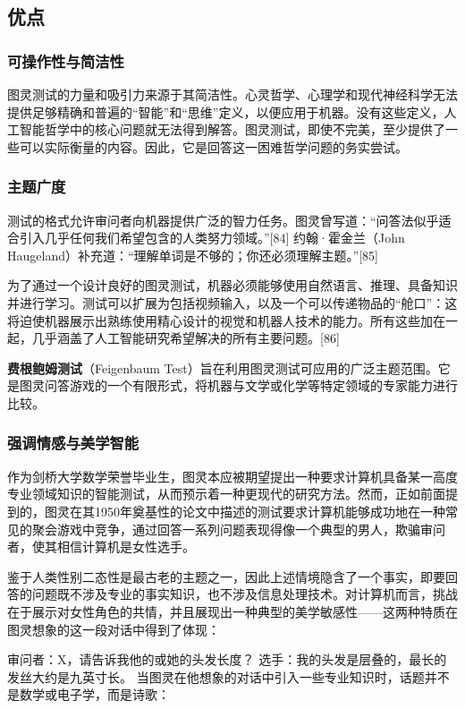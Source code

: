 \subsection{优点}
\subsubsection{可操作性与简洁性}  
图灵测试的力量和吸引力来源于其简洁性。心灵哲学、心理学和现代神经科学无法提供足够精确和普遍的“智能”和“思维”定义，以便应用于机器。没有这些定义，人工智能哲学中的核心问题就无法得到解答。图灵测试，即使不完美，至少提供了一些可以实际衡量的内容。因此，它是回答这一困难哲学问题的务实尝试。
\subsubsection{主题广度}  
测试的格式允许审问者向机器提供广泛的智力任务。图灵曾写道：“问答法似乎适合引入几乎任何我们希望包含的人类努力领域。”[84] 约翰·霍金兰（John Haugeland）补充道：“理解单词是不够的；你还必须理解主题。”[85]

为了通过一个设计良好的图灵测试，机器必须能够使用自然语言、推理、具备知识并进行学习。测试可以扩展为包括视频输入，以及一个可以传递物品的“舱口”：这将迫使机器展示出熟练使用精心设计的视觉和机器人技术的能力。所有这些加在一起，几乎涵盖了人工智能研究希望解决的所有主要问题。[86]

\textbf{费根鲍姆测试}（Feigenbaum Test）旨在利用图灵测试可应用的广泛主题范围。它是图灵问答游戏的一个有限形式，将机器与文学或化学等特定领域的专家能力进行比较。
\subsubsection{强调情感与美学智能} 
作为剑桥大学数学荣誉毕业生，图灵本应被期望提出一种要求计算机具备某一高度专业领域知识的智能测试，从而预示着一种更现代的研究方法。然而，正如前面提到的，图灵在其1950年奠基性的论文中描述的测试要求计算机能够成功地在一种常见的聚会游戏中竞争，通过回答一系列问题表现得像一个典型的男人，欺骗审问者，使其相信计算机是女性选手。

鉴于人类性别二态性是最古老的主题之一，因此上述情境隐含了一个事实，即要回答的问题既不涉及专业的事实知识，也不涉及信息处理技术。对计算机而言，挑战在于展示对女性角色的共情，并且展现出一种典型的美学敏感性——这两种特质在图灵想象的这一段对话中得到了体现：

审问者：X，请告诉我他的或她的头发长度？  
选手：我的头发是层叠的，最长的发丝大约是九英寸长。  
当图灵在他想象的对话中引入一些专业知识时，话题并不是数学或电子学，而是诗歌：

